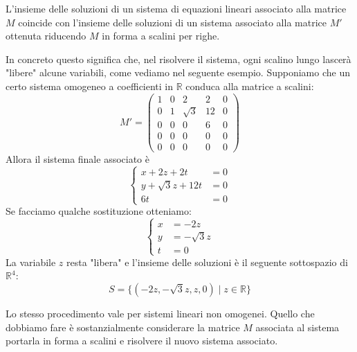 \begin{theorem}
	L'insieme delle soluzioni di un sistema di equazioni lineari associato alla
	matrice $M$ coincide con l'insieme delle soluzioni di un sistema associato
	alla matrice $M'$ ottenuta riducendo $M$ in forma a scalini per righe.
\end{theorem}

\begin{observation}
	In concreto questo significa che, nel risolvere il sistema, ogni scalino
	lungo lascerà "libere" alcune variabili, come vediamo nel seguente esempio.
	Supponiamo che un certo sistema omogeneo a coefficienti in $\mathbb{R}$
	conduca alla matrice a scalini:
	\begin{equation*}
		M' = \begin{pmatrix}
			1 & 0 & 2        & 2  & 0 \\
			0 & 1 & \sqrt{3} & 12 & 0 \\
			0 & 0 & 0        & 6  & 0 \\
			0 & 0 & 0        & 0  & 0 \\
			0 & 0 & 0        & 0  & 0
		\end{pmatrix}
	\end{equation*}
	Allora il sistema finale associato \`e
	\begin{equation*}
		\begin{cases}
			x + 2z + 2t         & = 0 \\
			y + \sqrt{3}z + 12t & = 0 \\
			6t                  & = 0
		\end{cases}
	\end{equation*}
	Se facciamo qualche sostituzione otteniamo:
	\begin{equation*}
		\begin{cases}
			x & = -2z         \\
			y & = -\sqrt{3} z \\
			t & = 0
		\end{cases}
	\end{equation*}
	La variabile $z$ resta "libera" e l'insieme delle soluzioni \`e il seguente
	sottospazio di $\mathbb{R}^4$:
	\begin{equation*}
		S = \{ (-2z, -\sqrt{3}z, z, 0 ) \mid z \in \mathbb{R} \}
	\end{equation*}
\end{observation}

Lo stesso procedimento vale per sistemi lineari non omogenei.
Quello che dobbiamo fare \`e sostanzialmente considerare la matrice $M$ associata 
al sistema portarla in forma a scalini e risolvere il nuovo sistema associato.

